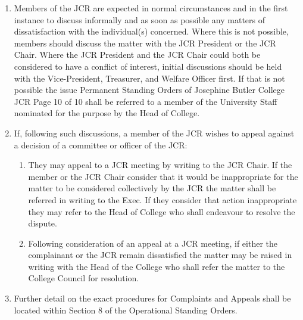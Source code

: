 \begin{enumerate}
    \item Members of the JCR are expected in normal circumstances and in the first instance to discuss informally and as soon as possible any matters of dissatisfaction with the individual(s) concerned. Where this is not possible, members should discuss the matter with the JCR President or the JCR Chair. Where the JCR President and the JCR Chair could both be considered to have a conflict of interest, initial discussions should be held with the Vice-President, Treasurer, and Welfare Officer first. If that is not possible the issue Permanent Standing Orders of Josephine Butler College JCR Page 10 of 10 shall be referred to a member of the University Staff nominated for the purpose by the Head of College.
    \item If, following such discussions, a member of the JCR wishes to appeal against a decision of a committee or officer of the JCR:
    \begin{enumerate}
        \item They may appeal to a JCR meeting by writing to the JCR Chair. If the member or the JCR Chair consider that it would be inappropriate for the matter to be considered collectively by the JCR the matter shall be referred in writing to the Exec. If they consider that action inappropriate they may refer to the Head of College who shall endeavour to resolve the dispute.
        \item Following consideration of an appeal at a JCR meeting, if either the complainant or the JCR remain dissatisfied the matter may be raised in writing with the Head of the College who shall refer the matter to the College Council for resolution.
    \end{enumerate}
    \item Further detail on the exact procedures for Complaints and Appeals shall be located within Section 8 of the Operational Standing Orders.
\end{enumerate}
